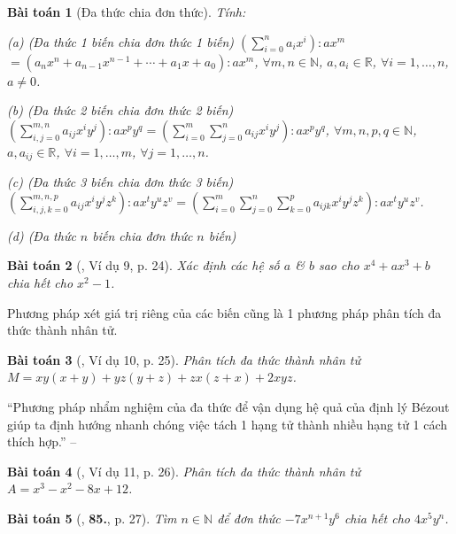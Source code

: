 \documentclass{article}
\numberwithin{equation}{section}
\newtheorem{baitoan}{Bài toán}[section]
\begin{document}
\begin{baitoan}[Đa thức chia đơn thức]
	Tính:
	\begin{enumerate*}
		\item[(a)] \emph{(Đa thức 1 biến chia đơn thức 1 biến)} $\left(\sum_{i=0}^n a_ix^i\right):ax^m$\\$= (a_nx^n + a_{n-1}x^{n-1} + \cdots + a_1x + a_0):ax^m$, $\forall m,n\in\mathbb{N}$, $a,a_i\in\mathbb{R}$, $\forall i = 1,\ldots,n$, $a\ne 0$.
		\item[(b)] \emph{(Đa thức 2 biến chia đơn thức 2 biến)} $\left(\sum_{i,j=0}^{m,n} a_{ij}x^iy^j\right):ax^py^q = \left(\sum_{i=0}^m\sum_{j=0}^n a_{ij}x^iy^j\right):ax^py^q$, $\forall m,n,p,q\in\mathbb{N}$, $a,a_{ij}\in\mathbb{R}$, $\forall i = 1,\ldots,m$, $\forall j = 1,\ldots,n$.
		\item[(c)] \emph{(Đa thức 3 biến chia đơn thức 3 biến)} $\left(\sum_{i,j,k=0}^{m,n,p} a_{ij}x^iy^jz^k\right):ax^ty^uz^v = \left(\sum_{i=0}^m\sum_{j=0}^n\sum_{k=0}^p a_{ijk}x^iy^jz^k\right):ax^ty^uz^v$.
		\item[(d)] \emph{(Đa thức $n$ biến chia đơn thức $n$ biến)}
	\end{enumerate*}
\end{baitoan}

\begin{baitoan}[\cite{Tuyen_Toan_8}, Ví dụ 9, p. 24]
	Xác định các hệ số $a$ \& $b$ sao cho $x^4 + ax^3 + b$ chia hết cho $x^2 - 1$.
\end{baitoan}
Phương pháp xét giá trị riêng của các biến cũng là 1 phương pháp phân tích đa thức thành nhân tử.

\begin{baitoan}[\cite{Tuyen_Toan_8}, Ví dụ 10, p. 25]
	Phân tích đa thức thành nhân tử $M = xy(x + y) + yz(y + z) + zx(z + x) + 2xyz$.
\end{baitoan}
``Phương pháp nhẩm nghiệm của đa thức để vận dụng hệ quả của định lý B\'ezout giúp ta định hướng nhanh chóng việc tách 1 hạng tử thành nhiều hạng tử 1 cách thích hợp.'' -- \cite[pp. 26]{Tuyen_Toan_8}

\begin{baitoan}[\cite{Tuyen_Toan_8}, Ví dụ 11, p. 26]
	Phân tích đa thức thành nhân tử $A = x^3 - x^2 - 8x + 12$.
\end{baitoan}

\begin{baitoan}[\cite{Tuyen_Toan_8}, \textbf{85.}, p. 27]
	Tìm $n\in\mathbb{N}$ để đơn thức $-7x^{n+1}y^6$ chia hết cho $4x^5y^n$.
\end{baitoan}
\end{document}
